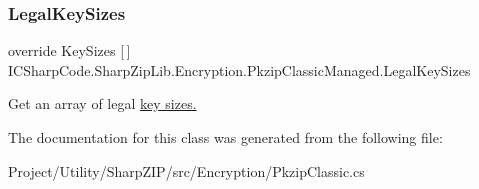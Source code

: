 \subsubsection{\texorpdfstring{Legal\+Key\+Sizes}{LegalKeySizes}}
{\footnotesize\ttfamily override Key\+Sizes \mbox{[}$\,$\mbox{]} I\+C\+Sharp\+Code.\+Sharp\+Zip\+Lib.\+Encryption.\+Pkzip\+Classic\+Managed.\+Legal\+Key\+Sizes\hspace{0.3cm}{\ttfamily [get]}}



Get an array of legal \hyperlink{}{key sizes.} 



The documentation for this class was generated from the following file\+:\begin{DoxyCompactItemize}
\item 
Project/\+Utility/\+Sharp\+Z\+I\+P/src/\+Encryption/Pkzip\+Classic.\+cs\end{DoxyCompactItemize}
